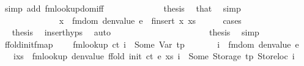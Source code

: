 \begin{isabellebody}
\ {\isacharparenleft}{\kern0pt}simp\ add{\isacharcolon}{\kern0pt}\ fmlookup{\isacharunderscore}{\kern0pt}dom{\isacharunderscore}{\kern0pt}iff{\isacharparenright}{\kern0pt}\isanewline
\ \ \ \ \ \ \ \ \ \ \isamarkupfalse%
\ \isamarkupfalse%
\ {\isacharquery}{\kern0pt}thesis\ \isamarkupfalse%
\ that\ \isamarkupfalse%
\ simp\isanewline
\ \ \ \ \ \ \ \ \isamarkupfalse%
\isanewline
\ \ \ \ \ \ \isamarkupfalse%
\ \isanewline
\ \ \ \ \isamarkupfalse%
\isanewline
\ \ \ \ \isamarkupfalse%
\ \isamarkupfalse%
\ {\isachardoublequoteopen}x{\isacharprime}{\kern0pt}\ {\isacharbar}{\kern0pt}{\isasymin}{\isacharbar}{\kern0pt}\ fmdom\ {\isacharparenleft}{\kern0pt}denvalue\ e{\isacharparenright}{\kern0pt}\ {\isacharbar}{\kern0pt}{\isasymunion}{\isacharbar}{\kern0pt}\ finsert\ x\ xs{\isachardoublequoteclose}\isanewline
\ \ \ \ \isamarkupfalse%
\ cases\isanewline
\ \ \ \ \ \ \isamarkupfalse%
\ {}\isanewline
\ \ \ \ \ \ \isamarkupfalse%
\ \isamarkupfalse%
\ {\isacharquery}{\kern0pt}thesis\ \isamarkupfalse%
\ insert{\isachardot}{\kern0pt}hyps\ \isamarkupfalse%
\ auto\isanewline
\ \ \ \ \isamarkupfalse%
\isanewline
\ \ \ \ \ \ \isamarkupfalse%
\ {}\isanewline
\ \ \ \ \ \ \isamarkupfalse%
\ \isamarkupfalse%
\ {\isacharquery}{\kern0pt}thesis\ \isamarkupfalse%
\ simp\isanewline
\ \ \ \ \isamarkupfalse%
\isanewline
\ \ \isamarkupfalse%
\isanewline
{}\isamarkupfalse%
%
\endisatagproof
{\isafoldproof}%
%
\isadelimproof
\isanewline
%
\endisadelimproof
\isanewline
{}\isamarkupfalse%
\ ffold{\isacharunderscore}{\kern0pt}init{\isacharunderscore}{\kern0pt}fmap{\isacharcolon}{\kern0pt}\ \isanewline
\ \ \ {\isachardoublequoteopen}fmlookup\ ct\ i\ {\isacharequal}{\kern0pt}\ Some\ {\isacharparenleft}{\kern0pt}Var\ tp{\isacharparenright}{\kern0pt}{\isachardoublequoteclose}\isanewline
\ \ \ \ \ \ \ {\isachardoublequoteopen}i\ {\isacharbar}{\kern0pt}{\isasymnotin}{\isacharbar}{\kern0pt}\ fmdom\ {\isacharparenleft}{\kern0pt}denvalue\ e{\isacharparenright}{\kern0pt}{\isachardoublequoteclose}\isanewline
\ \ \ {\isachardoublequoteopen}i{\isacharbar}{\kern0pt}{\isasymin}{\isacharbar}{\kern0pt}xs\ {\isasymLongrightarrow}\ fmlookup\ {\isacharparenleft}{\kern0pt}denvalue\ {\isacharparenleft}{\kern0pt}ffold\ {\isacharparenleft}{\kern0pt}init\ ct{\isacharparenright}{\kern0pt}\ e\ xs{\isacharparenright}{\kern0pt}{\isacharparenright}{\kern0pt}\ i\ {\isacharequal}{\kern0pt}\ Some\ {\isacharparenleft}{\kern0pt}Storage\ tp{\isacharcomma}{\kern0pt}\ Storeloc\ i{\isacharparenright}{\kern0pt}{\isachardoublequoteclose}\isanewline

\end{isabellebody}
